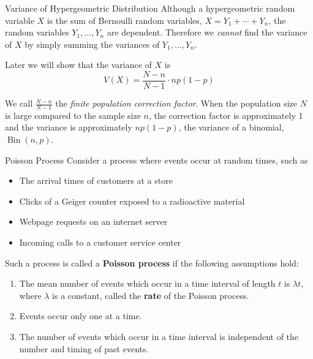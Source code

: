 \documentclass[xcolor=table]{beamer}
\DeclareMathOperator{\Bin}{Bin}
\renewcommand{\emph}{\textbf}
\begin{document}
\begin{frame}{Variance of Hypergeometric Distribution}
Although a hypergeometric random variable $X$ is the sum of Bernoulli random variables, $X=Y_1+\cdots+Y_n$, the random variables $Y_1,\dots,Y_n$ are dependent. Therefore we \textit{cannot} find the variance of $X$ by simply summing the variances of $Y_1, \dots, Y_n$.

\vspace{.2cm}
\pause Later we will show that the variance of $X$ is
$$V(X)=\frac{N-n}{N-1}\cdot np(1-p)$$

\pause We call $\frac{N-n}{N-1}$ the \textit{finite population correction factor}. When the population size $N$ is large compared to the sample size $n$, the correction factor is approximately 1 and the variance is approximately $np(1-p)$, the variance of a binomial, $\Bin(n,p)$.
\end{frame}

\begin{frame}{Poisson Process}
Consider a process where events occur at random times, such as
\begin{itemize}
\item The arrival times of customers at a store
\item Clicks of a Geiger counter exposed to a radioactive material
\item Webpage requests on an internet server
\item Incoming calls to a customer service center
\end{itemize}
\pause Such a process is called a \emph{Poisson process} if the following assumptions hold:
\begin{enumerate}
\item The mean number of events which occur in a time interval of length $t$ is $\lambda t$, where $\lambda$ is a constant, called the \emph{rate} of the Poisson process.
\item Events occur only one at a time.
\item The number of events which occur in a time interval is independent of the number and timing of past events.
\end{enumerate}
\end{frame}
\end{document}
